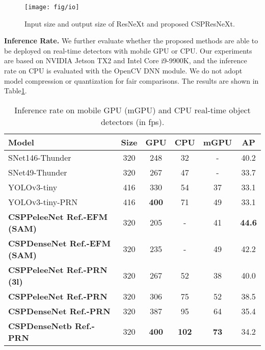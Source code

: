 \documentclass{article}
\begin{document}
\vspace*{1mm}

\begin{figure}[h]
	\begin{center}
		\texttt{[image: fig/io]}
	\end{center}
	\caption{Input size and output size of ResNeXt and proposed CSPResNeXt. }
	\label{fig:io}
\end{figure}

{\bf Inference Rate.} We further evaluate whether the proposed methods are able to be deployed on real-time detectors with mobile GPU or CPU. Our experiments are based on NVIDIA Jetson TX2 and Intel Core i9-9900K, and the inference rate on CPU is evaluated with the OpenCV DNN module. We do not adopt model compression or quantization for fair comparisons. The results are shown in Table\ref{table:speed}.

\begin{table}[h]
	\centering
	\begin{threeparttable}[h]
		\footnotesize
		\caption{Inference rate on mobile GPU (mGPU) and CPU real-time object detectors (in fps).}
		\label{table:speed}
		\setlength\tabcolsep{2.0pt}
		\begin{tabular}{lccccc}
			\toprule
			Model & Size & GPU & CPU & mGPU & AP \\			
			\midrule
			SNet146-Thunder \cite{qin2019thundernet} & 320 & 248 & 32 & - & 40.2 \\	
			SNet49-Thunder \cite{qin2019thundernet} & 320 & 267 & 47 & - & 33.7 \\	
			\midrule
			YOLOv3-tiny \cite{redmon2018yolov3} & 416 & 330 & 54 & 37 & 33.1 \\
			YOLOv3-tiny-PRN \cite{wang2019enriching} & 416 & \textbf{400} & 71 & 49 & 33.1 \\		
			\midrule
			\textbf{CSPPeleeNet Ref.-EFM (SAM)} & 320 & 205 & - & 41 & \textbf{44.6} \\	
			\textbf{CSPDenseNet Ref.-EFM (SAM)} & 320 & 235 & - & 49 & 42.2 \\	
			\midrule
			\textbf{CSPPeleeNet Ref.-PRN (3l)} & 320 & 267 & 52 & 38 & 40.0 \\	
			\textbf{CSPPeleeNet Ref.-PRN} & 320 & 306 & 75 & 52 & 38.5 \\	
			\textbf{CSPDenseNet Ref.-PRN} & 320 & 387 & 95 & 64 & 35.4 \\	
			\textbf{CSPDenseNetb Ref.-PRN} & 320 & \textbf{400} & \textbf{102} & \textbf{73} & 34.2 \\	
			\bottomrule
		\end{tabular}
	\end{threeparttable}
\end{table}
\end{document}
